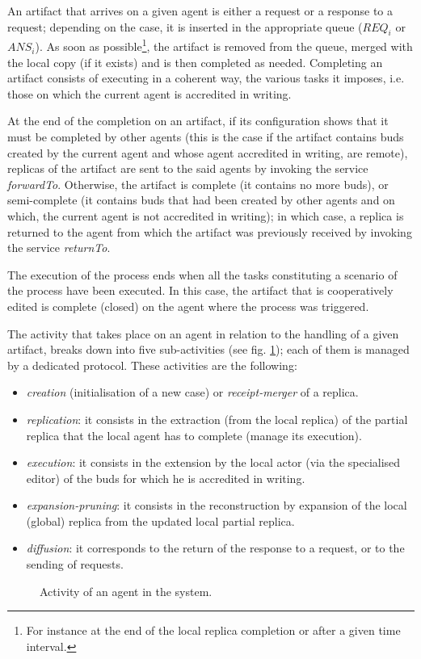 An artifact that arrives on a given agent is either a request or a response to a request; depending on the case, it is inserted in the appropriate queue ($REQ_i$ or $ANS_i$).
As soon as possible\footnote{For instance at the end of the local replica completion or after a given time interval.}, the artifact is removed from the queue, merged with the local copy (if it exists) and is then completed as needed.
Completing an artifact consists of executing in a coherent way, the various tasks it imposes, i.e. those on which the current agent is accredited in writing.

At the end of the completion on an artifact, if its configuration shows that it must be completed by other agents (this is the case if the artifact contains buds created by the current agent and whose agent accredited in writing, are remote), replicas of the artifact are sent to the said agents by invoking the service \textit{forwardTo}.
Otherwise, the artifact is complete (it contains no more buds), or semi-complete (it contains buds that had been created by other agents and on which, the current agent is not accredited in writing); in which case, a replica is returned to the agent from which the artifact was previously received by invoking the service \textit{returnTo}.


The execution of the process ends when all the tasks constituting a scenario of the process have been executed. In this case, the artifact that is cooperatively edited is complete (closed) on the agent where the process was triggered.



\label{chap3:sec:the-protocols}

The activity that takes place on an agent in relation to the handling of a given artifact, breaks down into five sub-activities (see fig. \ref{chap3:fig:peer-architecture}); each of them is managed by a dedicated protocol. These activities are the following: 

\begin{itemize}
	\item \textit{creation} (initialisation of a new case) or \textit{receipt-merger} of a replica.
	\item \textit{replication}: it consists in the extraction (from the local replica) of the partial replica that the local agent has to complete (manage its execution).
	\item \textit{execution}: it consists in the extension by the local actor (via the specialised editor) of the buds for which he is accredited in writing.
	\item \textit{expansion-pruning}: it consists in the reconstruction by expansion of the local (global) replica from the updated local partial replica.
	\item \textit{diffusion}: it corresponds to the return of the response to a request, or to the sending of requests.
\end{itemize}
\begin{figure}[ht!]
	\noindent
	\caption{Activity of an agent in the system.}
	\label{chap3:fig:peer-architecture}
\end{figure}

